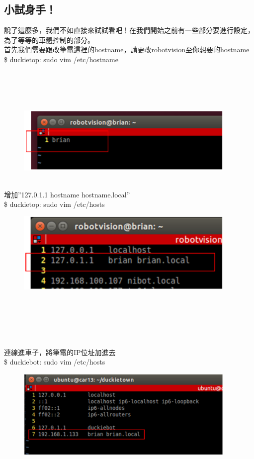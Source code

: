 \documentclass{article}
\begin{document}
\subsection{小試身手！}
說了這麼多，我們不如直接來試試看吧！在我們開始之前有一些部分要進行設定，為了等等的車體控制的部分。
\\首先我們需要跟改筆電這裡的hostname，請更改robotvision至你想要的hostname
\\\$ duckietop: sudo vim /etc/hostname 
\\\\\\\\\\
\begin{figure}[htp]
    \begin{center}
        \includegraphics[width=300pt]{pic/3_3_3.png}
    \end{center}
\end{figure}
\\
增加”127.0.1.1 hostname hostname.local”
\\\$ duckietop: sudo vim /etc/hosts
\begin{figure}[htp]
    \begin{center}
        \includegraphics[width=300pt]{pic/3_3_4.png}
    \end{center}
\end{figure}
\\
\\\\\\\\連線進車子，將筆電的IP位址加進去
\\\$ duckiebot: sudo vim /etc/hosts 
\begin{figure}[htp]
    \begin{center}
        \includegraphics[width=300pt]{pic/3_3_5.png}
    \end{center}
\end{figure}
\end{document}
